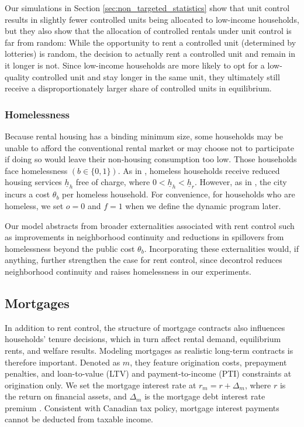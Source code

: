 \documentclass[parskip=full]{article}
\begin{document}
Our simulations in Section \ref{sec:non_targeted_statistics} show that unit control results in slightly fewer controlled units being allocated to low-income households, but they also show that the allocation of controlled rentals under unit control is far from random: While the opportunity to rent a controlled unit (determined by lotteries) is random, the decision to actually rent a controlled unit and remain in it longer is not. Since low-income households are more likely to opt for a low-quality controlled unit and stay longer in the same unit, they ultimately still receive a disproportionately larger share of controlled units in equilibrium.

\subsubsection{Homelessness}\label{sec:cohabit_homeless}

Because rental housing has a binding minimum size, some households may be unable to afford the conventional rental market or may choose not to participate if doing so would leave their non-housing consumption too low. Those households face homelessness $\left(b \in \{0,1\}\right)$. As in \citet{az-2024}, homeless households receive reduced housing services $\underline{h}_{h}$ free of charge, where $0<\underline{h}_{h}<\underline{h}_{r}$. However, as in \citet{abramson-2024}, the city incurs a cost $\theta_{b}$ per homeless household. For convenience, for households who are homeless, we set $o=0$ and $f=1$ when we define the dynamic program later.

Our model abstracts from broader externalities associated with rent control such as improvements in neighborhood continuity and reductions in spillovers from homelessness beyond the public cost $\theta_b$. Incorporating these externalities would, if anything, further strengthen the case for rent control, since decontrol reduces neighborhood continuity and raises homelessness in our experiments.

\subsection{Mortgages}\label{subsection:mortgages}

In addition to rent control, the structure of mortgage contracts also influences households' tenure decisions, which in turn affect rental demand, equilibrium rents, and welfare results. Modeling mortgages as realistic long-term contracts is therefore important. Denoted as $m$, they feature origination costs, prepayment penalties, and loan-to-value (LTV) and payment-to-income (PTI) constraints at origination only. We set the mortgage interest rate at $r_{m}=r+\Delta_m$, where $r$ is the return on financial assets, and $\Delta_m$ is the mortgage debt interest rate premium \citep{sommeretal-2013,sommersullivan-2017,kaplanetal-2019}. Consistent with Canadian tax policy, mortgage interest payments cannot be deducted from taxable income.
\end{document}
